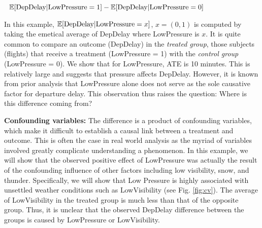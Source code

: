 \vspace*{0.2cm}
{\small \centering $ \ \ \mathbb{E}[ \text{DepDelay} | \text{LowPressure}=1] - \mathbb{E}[ \text{DepDelay} | \text{LowPressure}=0] $ }
\vspace*{0cm}

In this example, $\mathbb{E}[ \text{DepDelay} | \text{LowPressure}=x ]$, $x=(0,1)$ is computed by taking the emetical average of DepDelay where LowPressure is $x$. It is quite common to compare an outcome (DepDelay) in the {\em treated group}, those subjects (flights) that receive a treatment (LowPressure = 1) with the {\em control group} (LowPressure = 0). We show that for LowPressure, ATE is 10 minutes. This is relatively large and suggests that pressure affects DepDelay. However, it is known from prior analysis that LowPressure alone does not serve as the sole causative factor for departure delay. This observation thus raises the question: Where is this difference coming from?


{\bf Confounding variables:} The difference is a product of confounding variables, which make it difficult to establish a causal link between a treatment and outcome. This is often the case in real world analysis as the myriad of variables involved greatly complicate understanding a phenomenon. In this example, we will show that the observed positive effect of LowPressure was actually the result of the confounding influence of other factors including low visibility, snow, and thunder. Specifically, we will show that Low Pressure is highly associated with unsettled weather conditions such as LowVisibility (see Fig. \ref{fig:cv}). The average of LowVisibility in the treated group is much less than that of the opposite group. Thus, it is unclear that the observed DepDelay difference between the groups is caused by LowPressure or LowVisibility. 

